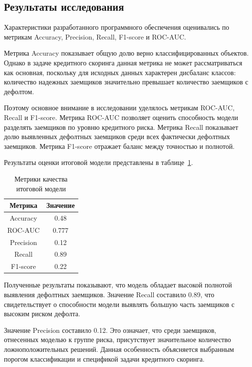 \subsection{Результаты исследования}

Характеристики разработанного программного обеспечения оценивались по метрикам Accuracy, Precision, Recall, F1-score и ROC-AUC.

Метрика Accuracy показывает общую долю верно классифицированных объектов. Однако в задаче кредитного скоринга данная метрика не может рассматриваться как основная, поскольку для исходных данных характерен дисбаланс классов: количество надежных заемщиков значительно превышает количество заемщиков с дефолтом.

Поэтому основное внимание в исследовании уделялось метрикам ROC-AUC, Recall и F1-score. Метрика ROC-AUC позволяет оценить способность модели разделять заемщиков по уровню кредитного риска. Метрика Recall показывает долю выявленных дефолтных заемщиков среди всех фактически дефолтных заемщиков. Метрика F1-score отражает баланс между точностью и полнотой.

Результаты оценки итоговой модели представлены в таблице~\ref{tab:research_metrics}.

\begin{table}[ht!]
    \centering
    \caption{Метрики качества итоговой модели}
    \label{tab:research_metrics}
    \begin{tabular}{|c|c|}
        \hline
        Метрика   & Значение \\
        \hline
        Accuracy  & 0.48     \\
        \hline
        ROC-AUC   & 0.777    \\
        \hline
        Precision & 0.12     \\
        \hline
        Recall    & 0.89     \\
        \hline
        F1-score  & 0.22     \\
        \hline
    \end{tabular}
\end{table}

Полученные результаты показывают, что модель обладает высокой полнотой выявления дефолтных заемщиков. Значение Recall составило 0.89, что свидетельствует о способности модели выявлять большую часть заемщиков с высоким риском дефолта.

Значение Precision составило 0.12. Это означает, что среди заемщиков, отнесенных моделью к группе риска, присутствует значительное количество ложноположительных решений. Данная особенность объясняется выбранным порогом классификации и спецификой задачи кредитного скоринга.

